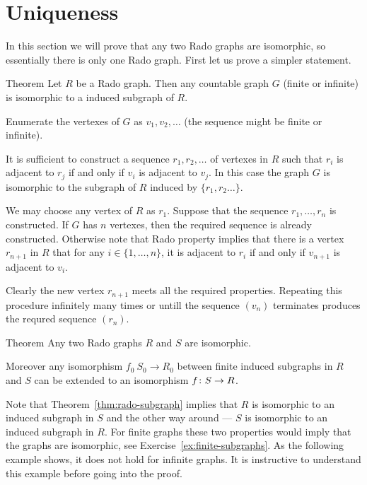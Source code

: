 \section*{Uniqueness}

In this section we will prove that any two Rado graphs are isomorphic, so essentially there is only one Rado graph.
First let us prove a simpler statement.

\begin{thm}{Theorem}\label{thm:rado-subgraph}
Let $R$ be a Rado graph.
Then any countable graph $G$ (finite or infinite) is isomorphic to a induced subgraph of $R$. 
\end{thm}

Enumerate the vertexes of $G$ as $v_1 , v_2 , \dots$ (the sequence might be finite or infinite).

It is sufficient to construct a sequence $r_1,r_2,\dots$ of vertexes in $R$ such that $r_i$ is adjacent to $r_j$ if and only if $v_i$ is adjacent to $v_j$.
In this case the graph $G$ is isomorphic to the subgraph of $R$ induced by $\{r_1,r_2\dots\}$.

We may choose any vertex of $R$ as $r_1$.
Suppose that the sequence $r_1,\dots,r_n$ is constructed.
If $G$ has $n$ vertexes, then the required sequence is already constructed.
Otherwise note that Rado property implies that there is a vertex $r_{n+1}$ in $R$ that for any $i\in\{1,\dots,n\}$, it is adjacent to $r_i$ if and only if $v_{n+1}$ is adjacent to $v_i$.

Clearly the new vertex $r_{n+1}$ meets all the required properties.
Repeating this procedure infinitely many times or untill the sequence $(v_n)$ terminates produces the requred sequence $(r_n)$.
\qeds


\begin{thm}{Theorem}
Any two Rado graphs $R$ and $S$ are isomorphic.

Moreover any isomorphism $f_0\:S_0\to R_0$ between finite induced subgraphs in $R$ and $S$ can be extended to an isomorphism $f\:S\z\to R$.
\end{thm}

Note that Theorem~\ref{thm:rado-subgraph} implies that $R$ is isomorphic to an induced subgraph in $S$ and the other way around --- $S$ is isomorphic to an induced subgraph in $R$.
For finite graphs these two properties would imply that the graphs are isomorphic, see Exercise~\ref{ex:finite-subgraphs}.
As the following example shows, it does not hold for infinite graphs.
It is instructive to understand this example before going into the proof.

